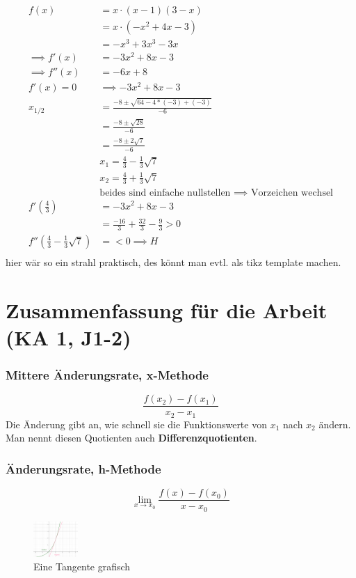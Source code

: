 \documentclass{report}
\begin{document}
\begin{align*}
f(x)&=x\cdot (x-1)(3-x)\\
&=x\cdot(-x^2+4x-3)\\
&=-x^3+3x^3-3x\\
\implies f'(x)&=-3x^2+8x-3\\
\implies f''(x)&=-6x+8\\
f'(x)=0&\implies -3x^2+8x-3\\
x_{1/2}&=\frac{-8 \pm \sqrt{64-4*(-3)+(-3)}}{-6}\\
       &=\frac{-8\pm \sqrt{28}}{-6}\\
       &=\frac{-8\pm 2\sqrt{7}}{-6}\\
       &x_1= \frac{4}{3}-\frac{1}{3}\sqrt{7}\\
       &x_2=\frac{4}{3}+ \frac{1}{3}\sqrt{7}\\
       &\text{beides sind einfache nullstellen $\implies$ Vorzeichen wechsel}\\
f'(\frac{4}{3})&=-3x^2+8x-3\\
               &=\frac{-16}{3}+\frac{32}{3}-\frac{9}{3}>0\\
f''(\frac{4}{3}-\frac{1}{3}\sqrt{7})&=<0 \implies H\\
\end{align*}
hier wär so ein strahl praktisch, des könnt man evtl. als tikz template machen.


\section{Zusammenfassung für die Arbeit (KA 1, J1-2)}
\subsubsection{Mittere Änderungsrate, x-Methode}
\[\frac{f(x_2)-f(x_1)}{x_2-x_1}\]
Die Änderung gibt an, wie schnell sie die Funktionswerte von $x_1$ nach $x_2$
ändern. Man nennt diesen Quotienten auch \textbf{Differenzquotienten}.

\subsubsection{Änderungsrate, h-Methode}
\[\lim_{x \to x_0}\frac{f(x)-f(x_0)}{x-x_0}\]

\begin{figure}[htpb]
  \begin{center}
    \includegraphics[width=0.15\textwidth]{math-figures/tangente.png}
  \end{center}
  \caption{Eine Tangente grafisch}
\end{figure}
\end{document}
